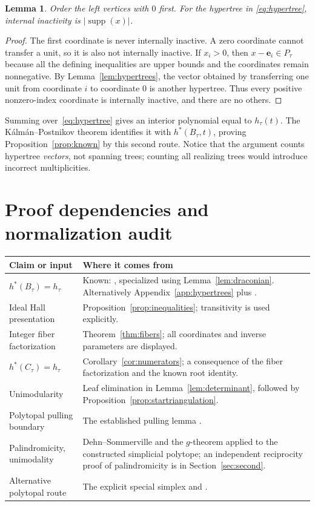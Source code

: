 \documentclass[11pt]{article}
\numberwithin{equation}{section}
\newtheorem{lemma}[theorem]{Lemma}
\theoremstyle{definition}
\newcommand{\supp}{\operatorname{supp}}
\newcommand{\ee}{\mathbf e}
\begin{document}
\begin{lemma}\label{lem:activity}
Order the left vertices with $0$ first. For the hypertree in
\eqref{eq:hypertree}, internal inactivity is $|\supp(x)|$.
\end{lemma}
\begin{proof}
The first coordinate is never internally inactive. A zero coordinate cannot
transfer a unit, so it is also not internally inactive. If $x_i>0$, then
$x-\ee_i\in P_\tau$ because all the defining inequalities are upper bounds
and the coordinates remain nonnegative. By Lemma~\ref{lem:hypertrees}, the
vector obtained by transferring one unit from coordinate $i$ to coordinate
$0$ is another hypertree. Thus every positive nonzero-index coordinate is
internally inactive, and there are no others.
\end{proof}

Summing over~\eqref{eq:hypertree} gives an interior polynomial equal to
$h_\tau(t)$. The K\'alm\'an--Postnikov theorem identifies it with
$h^*(B_\tau,t)$, proving Proposition~\ref{prop:known} by this second route.
Notice that the argument counts hypertree \emph{vectors}, not spanning trees;
counting all realizing trees would introduce incorrect multiplicities.

\section{Proof dependencies and normalization audit}\label{app:audit}

\begin{center}
\begin{tabularx}{\textwidth}{@{}p{}Y@{}}
\toprule
Claim or input & Where it comes from\\
\midrule
$h^*(B_\tau)=h_\tau$ & Known: \cite[Theorem~1.2]{DHLTW}, specialized using
Lemma~\ref{lem:draconian}. Alternatively Appendix~\ref{app:hypertrees} plus
\cite{KP}.\\[3pt]
Ideal Hall presentation & Proposition~\ref{prop:inequalities}; transitivity is
used explicitly.\\[3pt]
Integer fiber factorization & Theorem~\ref{thm:fibers}; all coordinates and
inverse parameters are displayed.\\[3pt]
$h^*(C_\tau)=h_\tau$ & Corollary~\ref{cor:numerators}; a consequence of the
fiber factorization and the known root identity.\\[3pt]
Unimodularity & Leaf elimination in Lemma~\ref{lem:determinant}, followed by
Proposition~\ref{prop:startriangulation}.\\[3pt]
Polytopal pulling boundary & The established pulling lemma
\cite[Lemma~2.1]{AthSpecial}.\\[3pt]
Palindromicity, unimodality & Dehn--Sommerville and the $g$-theorem applied to
the constructed simplicial polytope; an independent reciprocity proof of
palindromicity is in Section~\ref{sec:second}.\\[3pt]
Alternative polytopal route & The explicit special simplex and
\cite[Theorem~3.5]{AthSpecial}.\\
\bottomrule
\end{tabularx}
\end{center}
\end{document}
